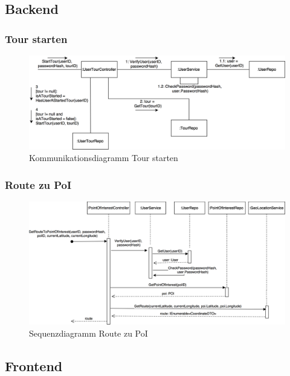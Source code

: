 \documentclass[a4paper,10pt,xetex]{article}
\begin{document}
\subsection{Backend}\label{backend}

\subsubsection{Tour starten}
\begin{figure}
  \includegraphics{Kommunikationsdiagramm_StartTour}
  \caption{Kommunikationsdiagramm Tour starten}
\end{figure}

\subsubsection{Route zu PoI}
\begin{figure}
  \includegraphics{Sequenzdiagramm_GetRouteToPoi}
  \caption{Sequenzdiagramm Route zu PoI}
\end{figure}

\subsection{Frontend}\label{frontend}
\end{document}
